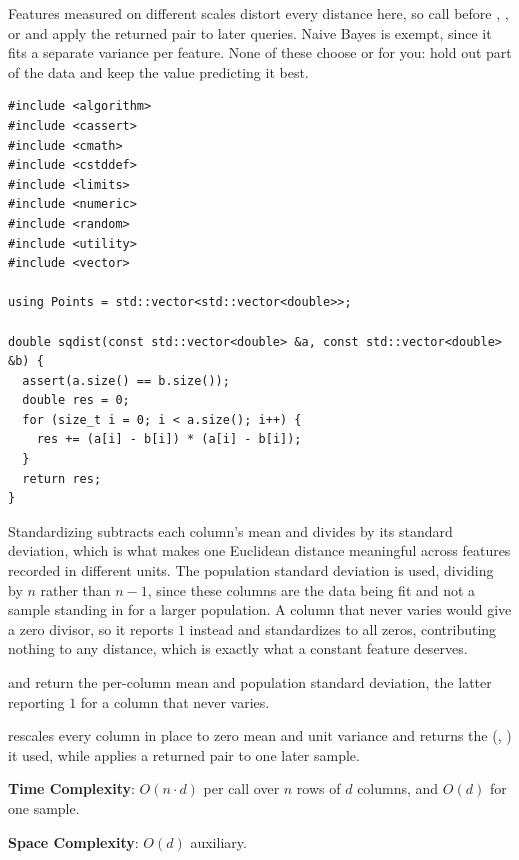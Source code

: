 Features measured on different scales distort every distance here, so call  before , , or  and apply the returned pair to later queries. Naive Bayes is exempt, since it fits a separate variance per feature. None of these choose  or  for you: hold out part of the data and keep the value predicting it best.

\begin{lstlisting}[style=cpp]
#include <algorithm>
#include <cassert>
#include <cmath>
#include <cstddef>
#include <limits>
#include <numeric>
#include <random>
#include <utility>
#include <vector>

using Points = std::vector<std::vector<double>>;

double sqdist(const std::vector<double> &a, const std::vector<double> &b) {
  assert(a.size() == b.size());
  double res = 0;
  for (size_t i = 0; i < a.size(); i++) {
    res += (a[i] - b[i]) * (a[i] - b[i]);
  }
  return res;
}
\end{lstlisting}
Standardizing subtracts each column's mean and divides by its standard deviation, which is what makes one Euclidean distance meaningful across features recorded in different units. The population standard deviation is used, dividing by $n$ rather than $n - 1$, since these columns are the data being fit and not a sample standing in for a larger population. A column that never varies would give a zero divisor, so it reports $1$ instead and standardizes to all zeros, contributing nothing to any distance, which is exactly what a constant feature deserves.

\begin{compactitem}
  \item {} and  return the per-column mean and population standard deviation, the latter reporting $1$ for a column that never varies.
  \item {} rescales every column in place to zero mean and unit variance and returns the (, ) it used, while  applies a returned pair to one later sample.
\end{compactitem}

\textbf{Time Complexity}: $O(n \cdot d)$ per call over $n$ rows of $d$ columns, and $O(d)$ for one sample.

\textbf{Space Complexity}: $O(d)$ auxiliary.


